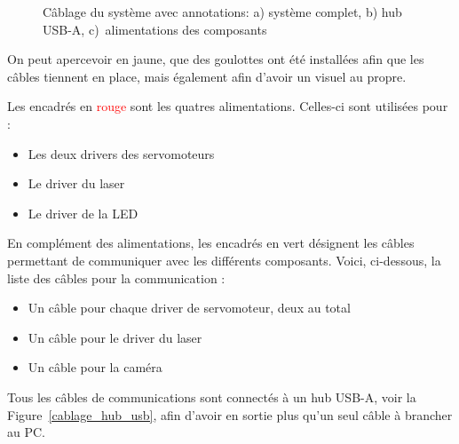 \begin{figure}[H]
    \caption{Câblage du système avec annotations: a) système complet, b) hub USB-A, c)~alimentations des composants}
    \label{cablage_kit_annoté}
\end{figure}

On peut apercevoir en \textcolor[RGB]{230, 230, 0}{jaune}, que des goulottes ont été installées afin que les câbles tiennent en place, mais également afin d'avoir un visuel au propre.

Les encadrés en \textcolor{red}{rouge} sont les quatres alimentations. Celles-ci sont utilisées pour :
\begin{itemize}
    \item Les deux drivers des servomoteurs
    \item Le driver du laser
    \item Le driver de la LED
\end{itemize}
\vspace{0.5em}
En complément des alimentations, les encadrés en \textcolor[RGB]{0, 201, 18}{vert} désignent les câbles permettant de communiquer avec les différents composants. Voici, ci-dessous, la liste des câbles pour la communication :
\begin{itemize}
    \item Un câble pour chaque driver de servomoteur, deux au total
    \item Un câble pour le driver du laser
    \item Un câble pour la caméra
\end{itemize}
\vspace{0.5em}
Tous les câbles de communications sont connectés à un hub USB-A, voir la Figure~\ref{cablage_hub_usb}, afin d'avoir en sortie plus qu'un seul câble à brancher au PC.